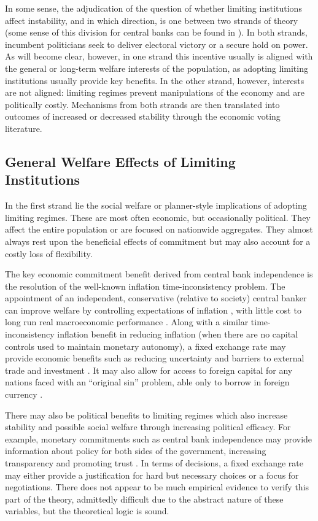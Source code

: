 \documentclass{article}
\begin{document}
    In some sense, the adjudication of the question of whether limiting institutions affect instability, and in which direction, is one between two strands of theory (some sense of this division for central banks can be found in \cite[p.212]{alesina_political_1997}). In both strands, incumbent politicians seek to deliver electoral victory or a secure hold on power. As will become clear, however, in one strand this incentive usually is aligned with the general or long-term welfare interests of the population, as adopting limiting institutions usually provide key benefits. In the other strand, however, interests are not aligned: limiting regimes prevent manipulations of the economy and are politically costly. Mechanisms from both strands are then translated into outcomes of increased or decreased stability through the economic voting literature.

    \subsection*{General Welfare Effects of Limiting Institutions}

    In the first strand lie the social welfare or planner-style implications of adopting limiting regimes. These are most often economic, but occasionally political. They affect the entire population or are focused on nationwide aggregates. They almost always rest upon the beneficial effects of commitment but may also account for a costly loss of flexibility.

    The key economic commitment benefit derived from central bank independence is the resolution of the well-known inflation time-inconsistency problem. The appointment of an independent, conservative (relative to society) central banker can improve welfare by controlling expectations of inflation \citep{rogoff_optimal_1985}, with little cost to long run real macroeconomic performance \citep{alesina_central_1993}. Along with a similar time-inconsistency inflation benefit in reducing inflation (when there are no capital controls used to maintain monetary autonomy), a fixed exchange rate may provide economic benefits such as reducing uncertainty and barriers to external trade and investment \citep{mundell_theory_1961}. It may also allow for access to foreign capital for any nations faced with an “original sin” problem, able only to borrow in foreign currency \citep{eichengreen_other_2005}.

    There may also be political benefits to limiting regimes which also increase stability and possible social welfare through increasing political efficacy. For example, monetary commitments such as central bank independence may provide information about policy for both sides of the government, increasing transparency and promoting trust \citep{bernhard_political_2002}. In terms of decisions, a fixed exchange rate may either provide a justification for hard but necessary choices or a focus for negotiations. There does not appear to be much empirical evidence to verify this part of the theory, admittedly difficult due to the abstract nature of these variables, but the theoretical logic is sound.
\end{document}
